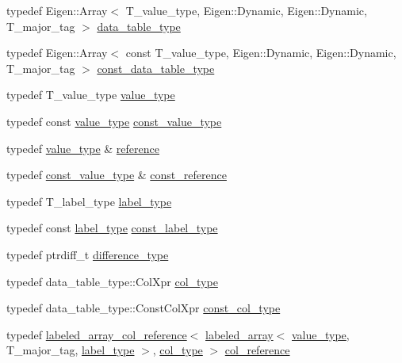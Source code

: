 \begin{DoxyCompactItemize}
\item 
typedef Eigen\+::\+Array$<$ T\+\_\+value\+\_\+type, Eigen\+::\+Dynamic, Eigen\+::\+Dynamic, T\+\_\+major\+\_\+tag $>$ \hyperlink{classIceBRG_1_1labeled__array_a43d1c710fe591f9610ab9e9827aabba6}{data\+\_\+table\+\_\+type}
\item 
typedef Eigen\+::\+Array$<$ const T\+\_\+value\+\_\+type, Eigen\+::\+Dynamic, Eigen\+::\+Dynamic, T\+\_\+major\+\_\+tag $>$ \hyperlink{classIceBRG_1_1labeled__array_a004378b6978779cae2c375a3a83001a2}{const\+\_\+data\+\_\+table\+\_\+type}
\item 
typedef T\+\_\+value\+\_\+type \hyperlink{classIceBRG_1_1labeled__array_a183002e8991647a6fbed8c13b64ff8f4}{value\+\_\+type}
\item 
typedef const \hyperlink{classIceBRG_1_1labeled__array_a183002e8991647a6fbed8c13b64ff8f4}{value\+\_\+type} \hyperlink{classIceBRG_1_1labeled__array_a4b9270762c39bd24b1f7855a7e21a63d}{const\+\_\+value\+\_\+type}
\item 
typedef \hyperlink{classIceBRG_1_1labeled__array_a183002e8991647a6fbed8c13b64ff8f4}{value\+\_\+type} \& \hyperlink{classIceBRG_1_1labeled__array_a2842648890bc2655f359ccfd4cb5ed63}{reference}
\item 
typedef \hyperlink{classIceBRG_1_1labeled__array_a4b9270762c39bd24b1f7855a7e21a63d}{const\+\_\+value\+\_\+type} \& \hyperlink{classIceBRG_1_1labeled__array_a334a51a867cad5d5c4ad682ebe1fd5a9}{const\+\_\+reference}
\item 
typedef T\+\_\+label\+\_\+type \hyperlink{classIceBRG_1_1labeled__array_a6355a8e274be241162cfe4717bcd907f}{label\+\_\+type}
\item 
typedef const \hyperlink{classIceBRG_1_1labeled__array_a6355a8e274be241162cfe4717bcd907f}{label\+\_\+type} \hyperlink{classIceBRG_1_1labeled__array_ae6050b70db84d1f34fefc241f46320f5}{const\+\_\+label\+\_\+type}
\item 
typedef ptrdiff\+\_\+t \hyperlink{classIceBRG_1_1labeled__array_af916a9e5d8e921f4fd310618f065e0fd}{difference\+\_\+type}
\item 
typedef data\+\_\+table\+\_\+type\+::\+Col\+Xpr \hyperlink{classIceBRG_1_1labeled__array_a4ee8f2983b8f309f1a8a470c12f56f2f}{col\+\_\+type}
\item 
typedef data\+\_\+table\+\_\+type\+::\+Const\+Col\+Xpr \hyperlink{classIceBRG_1_1labeled__array_aeba72c01006c312aedb340192a56901a}{const\+\_\+col\+\_\+type}
\item 
typedef \hyperlink{classIceBRG_1_1labeled__array__col__reference}{labeled\+\_\+array\+\_\+col\+\_\+reference}$<$ \hyperlink{classIceBRG_1_1labeled__array}{labeled\+\_\+array}$<$ \hyperlink{classIceBRG_1_1labeled__array_a183002e8991647a6fbed8c13b64ff8f4}{value\+\_\+type}, T\+\_\+major\+\_\+tag, \hyperlink{classIceBRG_1_1labeled__array_a6355a8e274be241162cfe4717bcd907f}{label\+\_\+type} $>$, \hyperlink{classIceBRG_1_1labeled__array_a4ee8f2983b8f309f1a8a470c12f56f2f}{col\+\_\+type} $>$ \hyperlink{classIceBRG_1_1labeled__array_aa7217b6c3b4a663d16f579aebab5e5cf}{col\+\_\+reference}

\end{DoxyCompactItemize}
